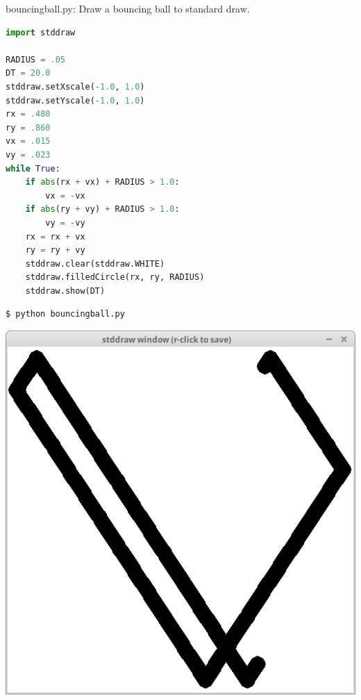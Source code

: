 \documentclass[8pt,a4paper,compress,handout]{beamer}
\begin{document}
\begin{frame}[fragile]
\begin{framed}
\tiny bouncingball.py: Draw a bouncing ball to standard draw.
\end{framed}

\begin{lstlisting}[language=Python]
import stddraw

RADIUS = .05
DT = 20.0
stddraw.setXscale(-1.0, 1.0)
stddraw.setYscale(-1.0, 1.0)
rx = .480
ry = .860
vx = .015
vy = .023
while True:
    if abs(rx + vx) + RADIUS > 1.0:
        vx = -vx
    if abs(ry + vy) + RADIUS > 1.0:
        vy = -vy
    rx = rx + vx
    ry = ry + vy
    stddraw.clear(stddraw.WHITE)
    stddraw.filledCircle(rx, ry, RADIUS)
    stddraw.show(DT)
\end{lstlisting}

\begin{minipage}{150pt}
\begin{lstlisting}[language={}]
$ python bouncingball.py
\end{lstlisting}
\end{minipage}%
\begin{minipage}{150pt}
\hfill \includegraphics[scale=0.13]{figures/bouncing_ball.png}
\end{minipage}
\end{frame}
\end{document}
